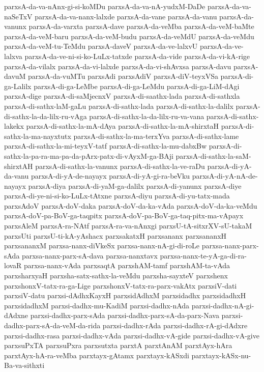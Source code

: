 {parxsA-da-va-nAnx-gi-si-koMDu
parxsA-da-va-nA-yudxM-DaDe
parxsA-da-va-naSeTxV
parxsA-da-va-nanx-lalxde
parxsA-da-vane
parxsA-da-vanu
parxsA-da-vanunx
parxsA-da-varxta
parxsA-dave
parxsA-da-veMba
parxsA-da-veM-baMte
parxsA-da-veM-baru
parxsA-da-veM-budu
parxsA-da-veMdU
parxsA-da-veMdu
parxsA-da-veM-tu-TeMdu
parxsA-daveV
parxsA-da-ve-lalxvU
parxsA-da-ve-lalxva
parxsA-da-ve-ni-si-ko-LuLx-tatxde
parxsA-da-vide
parxsA-da-vi-kA-rige
parxsA-da-vilalx
parxsA-da-vi-lalxde
parxsA-da-vi-shAvxsa
parxsA-davu
parxsA-davuM
parxsA-da-vuMTu
parxsAdi
parxsAdiV
parxsA-diV-teyxVSa
parxsA-di-ga-Lalilx
parxsA-di-ga-LeMbe
parxsA-di-ga-LeMdu
parxsA-di-ga-LiM-dAgi
parxsA-dige
parxsA-di-saMjecnxV
parxsA-di-saathx-lada
parxsA-di-sathxla
parxsA-di-sathx-laM-gaLu
parxsA-di-sathx-lada
parxsA-di-sathx-la-dalilx
parxsA-di-sathx-la-da-lilx-ru-vAga
parxsA-di-sathx-la-da-lilx-ru-va-vana
parxsA-di-sathx-lakekx
parxsA-di-sathx-la-mA-dAya
parxsA-di-sathx-la-mA-shirxtaH
parxsA-di-sathx-la-ma-nayxtutx
parxsA-di-sathx-la-ma-terxYva
parxsA-di-sathx-lame
parxsA-di-sathx-la-mi-teyxV-tatf
parxsA-di-sathx-la-mu-dabxBw
parxsA-di-sathx-la-pa-ra-ma-pa-da-pArx-patx-di-vAyxM-ga-BAji
parxsA-di-sathx-la-saM-shirxtAH
parxsA-di-sathx-la-vanunx
parxsA-di-sathx-la-ve-raDu
parxsA-di-yA-da-vanu
parxsA-di-yA-de-nayayx
parxsA-di-yA-gi-ra-beVku
parxsA-di-yA-nA-de-nayayx
parxsA-diya
parxsA-di-yaM-ga-dalilx
parxsA-di-yanunx
parxsA-diye
parxsA-di-ye-ni-si-ko-LuLx-tAtxne
parxsA-diyu
parxsA-di-yu-tatx-mada
parxsAdoV
parxsA-doV-daka
parxsA-doV-da-ka-vAda
parxsA-doV-da-ka-veMdu
parxsA-doV-pa-BoV-ga-taqpitx
parxsA-doV-pa-BoV-ga-taq-pitx-ma-vApayx
parxsAleM
parxsA-ra-NAtf
parxsA-ra-va-nAnxgi
parxsU-tA-sitxrXV-sU-takaM
parxsUti
parxsU-ti-kA-yAshacx
parxsakatxH
parxsananx
parxsananxH
parxsananxM
parxsa-nanx-diVkeSx
parxsa-nanx-nA-gi-di-roLe
parxsa-nanx-parx-sAda
parxsa-nanx-parx-sA-dava
parxsa-nanxtavx
parxsa-nanx-te-yA-ga-di-ra-lovaR
parxsa-nanx-vAda
parxsaqtA
parxshAM-tamf
parxshAM-ta-vAda
parxsharxyaH
parxsha-satx-sathx-la-veMdu
parxsha-sayxteV
parxshenx
parxshonxV-tatx-ra-ga-Lige
parxshonxV-tatx-ra-parx-vakAtx
parxsiV-dati
parxsiV-datu
parxsi-dAdhxKayxH
parxsidAdhxM
parxsidadhx
parxsidadhxH
parxsidadhxM
parxsi-dadhx-mu-KadiM
parxsi-dadhx-nAda
parxsi-dadhx-nA-gi-dAdxne
parxsi-dadhx-parx-sAda
parxsi-dadhx-parx-sA-da-parx-Nava
parxsi-dadhx-parx-sA-da-veM-da-rida
parxsi-dadhx-rAda
parxsi-dadhx-rA-gi-dAdxre
parxsi-dadhx-rasa
parxsi-dadhx-vAda
parxsi-dadhx-vA-gide
parxsi-dadhx-vA-give
parxsuPxTA
parxsuPxra
parxsutxta
parxtA
parxtAnAM
parxtAyx-hAra
parxtAyx-hA-ra-veMba
parxtayx-gAtamx
parxtayx-kASxdi
parxtayx-kASx-nu-Ba-va-sithxti
}
